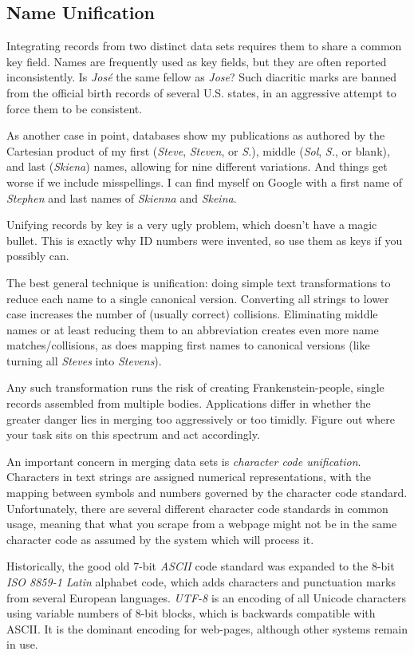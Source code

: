 \documentclass[10pt]{article}
\begin{document}
\subsection{Name Unification}
Integrating records from two distinct data sets requires them to share a common key field. Names are frequently used as key fields, but they are often reported inconsistently. Is \emph{José} the same fellow as \emph{Jose}? Such diacritic marks are banned from the official birth records of several U.S. states, in an aggressive attempt to force them to be consistent.

As another case in point, databases show my publications as authored by the Cartesian product of my first (\emph{Steve}, \emph{Steven}, or \emph{S.}), middle (\emph{Sol}, \emph{S.}, or blank), and last (\emph{Skiena}) names, allowing for nine different variations. And things get worse if we include misspellings. I can find myself on Google with a first name of \emph{Stephen} and last names of \emph{Skienna} and \emph{Skeina}.

Unifying records by key is a very ugly problem, which doesn't have a magic bullet. This is exactly why ID numbers were invented, so use them as keys if you possibly can.

The best general technique is unification: doing simple text transformations to reduce each name to a single canonical version. Converting all strings to lower case increases the number of (usually correct) collisions. Eliminating middle names or at least reducing them to an abbreviation creates even more name matches/collisions, as does mapping first names to canonical versions (like turning all \emph{Steves} into \emph{Stevens}).

Any such transformation runs the risk of creating Frankenstein-people, single records assembled from multiple bodies. Applications differ in whether the greater danger lies in merging too aggressively or too timidly. Figure out where your task sits on this spectrum and act accordingly.

An important concern in merging data sets is \emph{character code unification}. Characters in text strings are assigned numerical representations, with the mapping between symbols and numbers governed by the character code standard. Unfortunately, there are several different character code standards in common usage, meaning that what you scrape from a webpage might not be in the same character code as assumed by the system which will process it.

Historically, the good old 7-bit \emph{ASCII} code standard was expanded to the 8-bit \emph{ISO 8859-1 Latin} alphabet code, which adds characters and punctuation marks from several European languages. \emph{UTF-8} is an encoding of all Unicode characters using variable numbers of 8-bit blocks, which is backwards compatible with ASCII. It is the dominant encoding for web-pages, although other systems remain in use.
\end{document}

